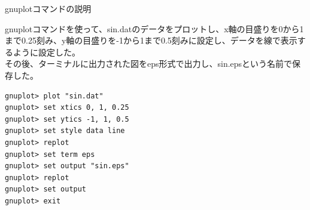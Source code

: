 \documentclass[a4j]{jsarticle}
\begin{document}
\textmd{gnuplotコマンドの説明} 

gnuplotコマンドを使って、sin.datのデータをプロットし、x軸の目盛りを0から1まで0.25刻み、y軸の目盛りを-1から1まで0.5刻みに設定し、データを線で表示するように設定した。\\  
その後、ターミナルに出力された図をeps形式で出力し、sin.epsという名前で保存した。\\

\begin{lstlisting}[basicstyle=\ttfamily\footnotesize, frame=single]
% gnuplot <Enter>
gnuplot> plot "sin.dat"
gnuplot> set xtics 0, 1, 0.25
gnuplot> set ytics -1, 1, 0.5
gnuplot> set style data line
gnuplot> replot
gnuplot> set term eps
gnuplot> set output "sin.eps"
gnuplot> replot
gnuplot> set output
gnuplot> exit
\end{lstlisting}
\end{document}
